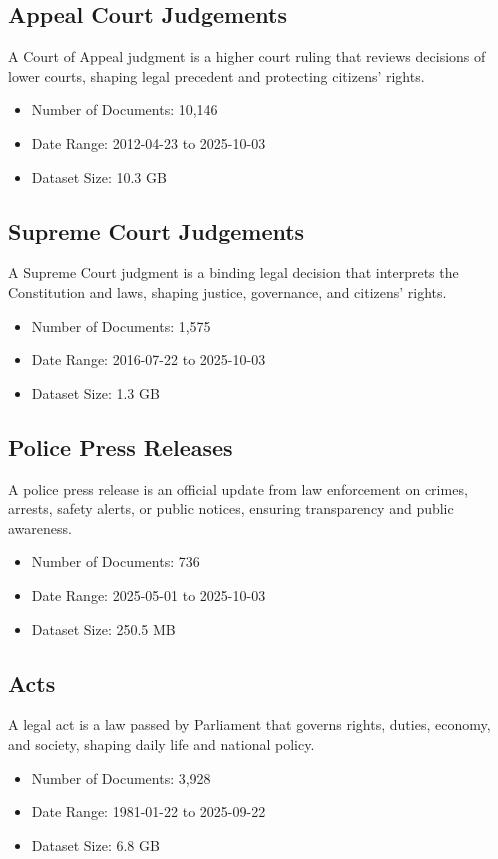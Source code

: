 \documentclass[10pt,a4paper]{article}%
\begin{document}
%
\subsection{Appeal Court Judgements}%
\label{subsec:AppealCourtJudgements}%
A Court of Appeal judgment is a higher court ruling that reviews decisions of lower courts, shaping legal precedent and protecting citizens’ rights.%
\begin{itemize}%
\item%
Number of Documents: 10,146%
\item%
Date Range: 2012{-}04{-}23 to 2025{-}10{-}03%
\item%
Dataset Size: 10.3 GB%
\end{itemize}

%
\subsection{Supreme Court Judgements}%
\label{subsec:SupremeCourtJudgements}%
A Supreme Court judgment is a binding legal decision that interprets the Constitution and laws, shaping justice, governance, and citizens’ rights.%
\begin{itemize}%
\item%
Number of Documents: 1,575%
\item%
Date Range: 2016{-}07{-}22 to 2025{-}10{-}03%
\item%
Dataset Size: 1.3 GB%
\end{itemize}

%
\subsection{Police Press Releases}%
\label{subsec:PolicePressReleases}%
A police press release is an official update from law enforcement on crimes, arrests, safety alerts, or public notices, ensuring transparency and public awareness.%
\begin{itemize}%
\item%
Number of Documents: 736%
\item%
Date Range: 2025{-}05{-}01 to 2025{-}10{-}03%
\item%
Dataset Size: 250.5 MB%
\end{itemize}

%
\subsection{Acts}%
\label{subsec:Acts}%
A legal act is a law passed by Parliament that governs rights, duties, economy, and society, shaping daily life and national policy.%
\begin{itemize}%
\item%
Number of Documents: 3,928%
\item%
Date Range: 1981{-}01{-}22 to 2025{-}09{-}22%
\item%
Dataset Size: 6.8 GB%
\end{itemize}
\end{document}
